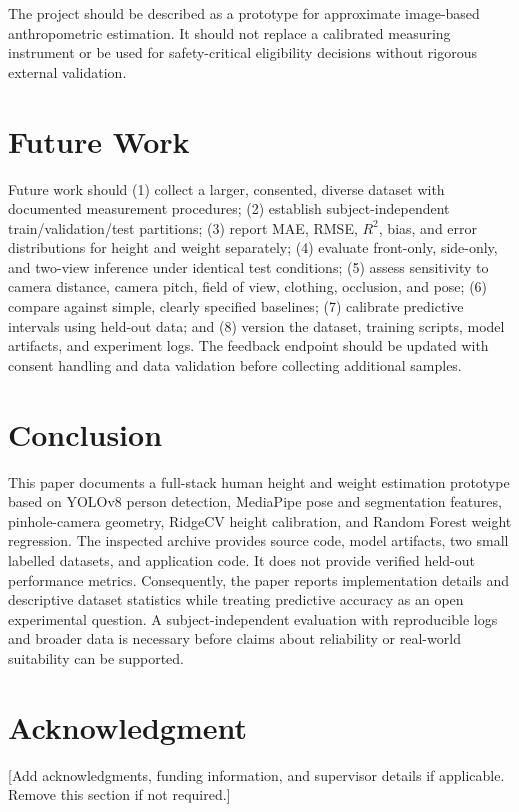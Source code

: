 \documentclass[conference]{IEEEtran}
\begin{document}
The project should be described as a prototype for approximate image-based anthropometric estimation. It should not replace a calibrated measuring instrument or be used for safety-critical eligibility decisions without rigorous external validation.

\section{Future Work}
Future work should (1) collect a larger, consented, diverse dataset with documented measurement procedures; (2) establish subject-independent train/validation/test partitions; (3) report MAE, RMSE, $R^2$, bias, and error distributions for height and weight separately; (4) evaluate front-only, side-only, and two-view inference under identical test conditions; (5) assess sensitivity to camera distance, camera pitch, field of view, clothing, occlusion, and pose; (6) compare against simple, clearly specified baselines; (7) calibrate predictive intervals using held-out data; and (8) version the dataset, training scripts, model artifacts, and experiment logs. The feedback endpoint should be updated with consent handling and data validation before collecting additional samples.

\section{Conclusion}
This paper documents a full-stack human height and weight estimation prototype based on YOLOv8 person detection, MediaPipe pose and segmentation features, pinhole-camera geometry, RidgeCV height calibration, and Random Forest weight regression. The inspected archive provides source code, model artifacts, two small labelled datasets, and application code. It does not provide verified held-out performance metrics. Consequently, the paper reports implementation details and descriptive dataset statistics while treating predictive accuracy as an open experimental question. A subject-independent evaluation with reproducible logs and broader data is necessary before claims about reliability or real-world suitability can be supported.

\section*{Acknowledgment}
[Add acknowledgments, funding information, and supervisor details if applicable. Remove this section if not required.]

\balance


\end{document}
